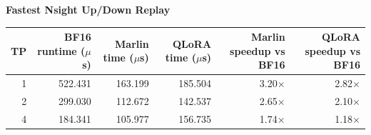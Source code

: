 \documentclass{article}
\begin{document}
\sffamily
\begin{center}
\textbf{Fastest Nsight Up/Down Replay}

\vspace{0.35em}
\renewcommand{\arraystretch}{1.25}
\begin{tabular}{r r r r r r}
\toprule
TP &
BF16 runtime ($\mu$s) &
Marlin time ($\mu$s) &
QLoRA time ($\mu$s) &
Marlin speedup vs BF16 &
QLoRA speedup vs BF16 \\
\midrule
1 & 522.431 & 163.199 & 185.504 & 3.20$\times$ & 2.82$\times$ \\
2 & 299.030 & 112.672 & 142.537 & 2.65$\times$ & 2.10$\times$ \\
4 & 184.341 & 105.977 & 156.735 & 1.74$\times$ & 1.18$\times$ \\
\bottomrule
\end{tabular}
\end{center}
\end{document}
